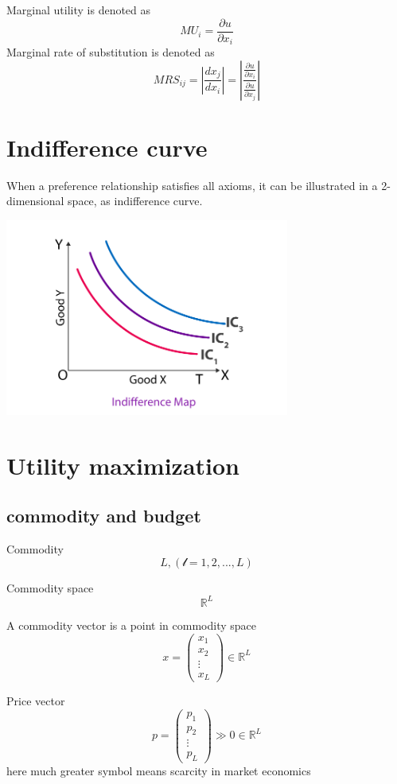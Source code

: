 \documentclass{article}
\begin{document}
Marginal utility is denoted as
$$MU_{i}=\frac{\partial{u}}{\partial{x_{i}}}$$
Marginal rate of substitution is denoted as
$$MRS_{ij}=|\frac{d x_{j}}{d x_{i}}|=|\frac{\frac{\partial{u}}{\partial{x_{i}}}}{\frac{\partial{u}}{\partial{x_{j}}}}|$$

\section{Indifference curve}
When a preference relationship satisfies all axioms, it can be illustrated in a 2-dimensional space, as indifference curve.

\includegraphics[width=0.7\textwidth]{images/Indifference-Map.png}

\section{Utility maximization}
\subsection{commodity and budget}
Commodity
$$L,(\mathscr{l}=1,2,...,L)$$

Commodity space
$$\mathbb{R}^{L}$$

A commodity vector is a point in commodity space
$$x=\begin{pmatrix}x_{1} \\ x_{2} \\ \vdots  \\ x_{L}\end{pmatrix}\in \mathbb{R}^{L}$$

Price vector
$$p=\begin{pmatrix}p_{1} \\ p_{2} \\ \vdots \\ p_{L}\end{pmatrix} \gg0\in \mathbb{R}^{L}$$
here much greater symbol means scarcity in market economics
\end{document}
